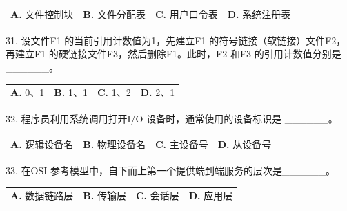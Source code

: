 \documentclass[UTF8,11pt]{ctexart}
\begin{document}
\begin{center}\begin{tabular}{>{\raggedright\arraybackslash}p{\dimexpr(\linewidth-8\tabcolsep)/4\relax}>{\raggedright\arraybackslash}p{\dimexpr(\linewidth-8\tabcolsep)/4\relax}>{\raggedright\arraybackslash}p{\dimexpr(\linewidth-8\tabcolsep)/4\relax}>{\raggedright\arraybackslash}p{\dimexpr(\linewidth-8\tabcolsep)/4\relax}}
\textbf{A.} 文件控制块 & \textbf{B.} 文件分配表 & \textbf{C.} 用户口令表 & \textbf{D.} 系统注册表\\[.35em]\end{tabular}\end{center}

31. 设文件F1 的当前引用计数值为1，先建立F1 的符号链接（软链接）文件F2，再建立F1 的硬链接文件F3，然后删除F1。此时，F2 和F3 的引用计数值分别是\_\_\_\_\_\_。


\begin{center}\begin{tabular}{>{\raggedright\arraybackslash}p{\dimexpr(\linewidth-8\tabcolsep)/4\relax}>{\raggedright\arraybackslash}p{\dimexpr(\linewidth-8\tabcolsep)/4\relax}>{\raggedright\arraybackslash}p{\dimexpr(\linewidth-8\tabcolsep)/4\relax}>{\raggedright\arraybackslash}p{\dimexpr(\linewidth-8\tabcolsep)/4\relax}}
\textbf{A.} 0、1 & \textbf{B.} 1、1 & \textbf{C.} 1、2 & \textbf{D.} 2、1\\[.35em]\end{tabular}\end{center}

32. 程序员利用系统调用打开I/O 设备时，通常使用的设备标识是 \_\_\_\_\_\_。


\begin{center}\begin{tabular}{>{\raggedright\arraybackslash}p{\dimexpr(\linewidth-8\tabcolsep)/4\relax}>{\raggedright\arraybackslash}p{\dimexpr(\linewidth-8\tabcolsep)/4\relax}>{\raggedright\arraybackslash}p{\dimexpr(\linewidth-8\tabcolsep)/4\relax}>{\raggedright\arraybackslash}p{\dimexpr(\linewidth-8\tabcolsep)/4\relax}}
\textbf{A.} 逻辑设备名 & \textbf{B.} 物理设备名 & \textbf{C.} 主设备号 & \textbf{D.} 从设备号\\[.35em]\end{tabular}\end{center}

33. 在OSI 参考模型中，自下而上第一个提供端到端服务的层次是\_\_\_\_\_\_。


\begin{center}\begin{tabular}{>{\raggedright\arraybackslash}p{\dimexpr(\linewidth-8\tabcolsep)/4\relax}>{\raggedright\arraybackslash}p{\dimexpr(\linewidth-8\tabcolsep)/4\relax}>{\raggedright\arraybackslash}p{\dimexpr(\linewidth-8\tabcolsep)/4\relax}>{\raggedright\arraybackslash}p{\dimexpr(\linewidth-8\tabcolsep)/4\relax}}
\textbf{A.} 数据链路层 & \textbf{B.} 传输层 & \textbf{C.} 会话层 & \textbf{D.} 应用层\\[.35em]\end{tabular}\end{center}
\end{document}
